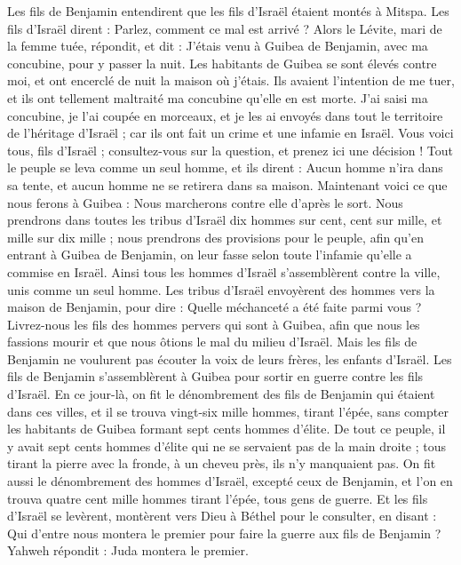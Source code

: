 \begin{multicols}{2}
Les fils de Benjamin entendirent que les fils d'Israël étaient montés à Mitspa. Les fils d'Israël dirent : Parlez, comment ce mal est arrivé ?
Alors le Lévite, mari de la femme tuée, répondit, et dit : J'étais venu à Guibea de Benjamin, avec ma concubine, pour y passer la nuit.
Les habitants de Guibea se sont élevés contre moi, et ont encerclé de nuit la maison où j'étais. Ils avaient l'intention de me tuer, et ils ont tellement maltraité ma concubine qu'elle en est morte.
J'ai saisi ma concubine, je l'ai coupée en morceaux, et je les ai envoyés dans tout le territoire de l'héritage d'Israël ; car ils ont fait un crime et une infamie en Israël.
Vous voici tous, fils d'Israël ; consultez-vous sur la question, et prenez ici une décision !
Tout le peuple se leva comme un seul homme, et ils dirent : Aucun homme n'ira dans sa tente, et aucun homme ne se retirera dans sa maison.
Maintenant voici ce que nous ferons à Guibea : Nous marcherons contre elle d'après le sort.
Nous prendrons dans toutes les tribus d'Israël dix hommes sur cent, cent sur mille, et mille sur dix mille ; nous prendrons des provisions pour le peuple, afin qu'en entrant à Guibea de Benjamin, on leur fasse selon toute l'infamie qu'elle a commise en Israël.
Ainsi tous les hommes d'Israël s'assemblèrent contre la ville, unis comme un seul homme.
Les tribus d'Israël envoyèrent des hommes vers la maison de Benjamin, pour dire : Quelle méchanceté a été faite parmi vous ?
Livrez-nous les fils des hommes pervers qui sont à Guibea, afin que nous les fassions mourir et que nous ôtions le mal du milieu d'Israël. Mais les fils de Benjamin ne voulurent pas écouter la voix de leurs frères, les enfants d'Israël.
Les fils de Benjamin s'assemblèrent à Guibea pour sortir en guerre contre les fils d'Israël.
En ce jour-là, on fit le dénombrement des fils de Benjamin qui étaient dans ces villes, et il se trouva vingt-six mille hommes, tirant l'épée, sans compter les habitants de Guibea formant sept cents hommes d'élite.
De tout ce peuple, il y avait sept cents hommes d'élite qui ne se servaient pas de la main droite ; tous tirant la pierre avec la fronde,  à un cheveu près,  ils n'y manquaient pas.
On fit aussi le dénombrement des hommes d'Israël, excepté ceux de Benjamin, et l'on en trouva quatre cent mille hommes tirant l'épée, tous gens de guerre.
Et les fils d'Israël se levèrent, montèrent vers Dieu à Béthel pour le consulter, en disant : Qui d'entre nous montera le premier pour faire la guerre aux fils de Benjamin ? Yahweh répondit : Juda montera le premier.

\end{multicols}
